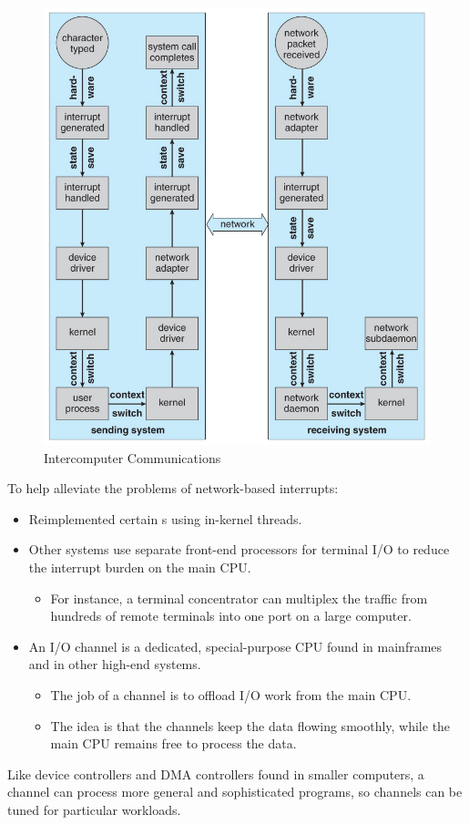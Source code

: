 \begin{figure}[h!tbp]
  \centering
  \includegraphics[scale=1.00]{./Drawings/EDAF35-Operating_Systems/Intercomputer_Communications.jpg}
  \caption{Intercomputer Communications}
  \label{fig:Intercomputer_Communications}
\end{figure}

To help alleviate the problems of network-based interrupts:
\begin{itemize}[noitemsep]
\item Reimplemented certain s using in-kernel threads.
\item Other systems use separate front-end processors for terminal I/O to reduce the interrupt burden on the main CPU.\@
  \begin{itemize}[noitemsep]
  \item For instance, a terminal concentrator can multiplex the traffic from hundreds of remote terminals into one port on a large computer.
  \end{itemize}
\item An I/O channel is a dedicated, special-purpose CPU found in mainframes and in other high-end systems.
  \begin{itemize}[noitemsep]
  \item The job of a channel is to offload I/O work from the main CPU.\@
  \item The idea is that the channels keep the data flowing smoothly, while the main CPU remains free to process the data.
  \end{itemize}
\end{itemize}

Like device controllers and DMA controllers found in smaller computers, a channel can process more general and sophisticated programs, so channels can be tuned for particular workloads.


